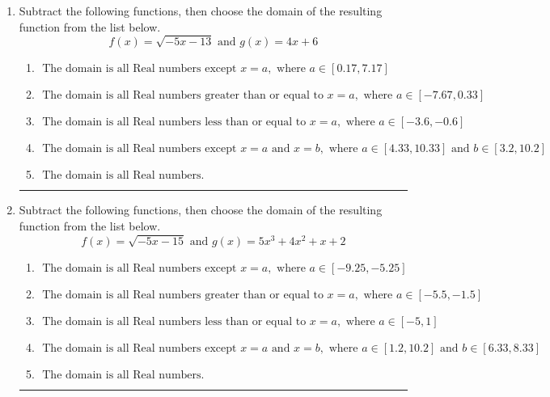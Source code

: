 \documentclass[14pt]{extbook}
\newcommand{\litem}[1]{\item#1\hspace*{-1cm}\rule{\textwidth}{0.4pt}}
\begin{document}
\begin{enumerate}
{\begin{enumerate}[label=\Alph*.]
\end{enumerate} }
\litem{
Subtract the following functions, then choose the domain of the resulting function from the list below.\[ f(x) = \sqrt{-5x-13}  \text{ and } g(x) = 4x + 6 \]\begin{enumerate}[label=\Alph*.]
\item \( \text{ The domain is all Real numbers except } x = a, \text{ where } a \in [0.17, 7.17] \)
\item \( \text{ The domain is all Real numbers greater than or equal to } x = a, \text{ where } a \in [-7.67, 0.33] \)
\item \( \text{ The domain is all Real numbers less than or equal to } x = a, \text{ where } a \in [-3.6, -0.6] \)
\item \( \text{ The domain is all Real numbers except } x = a \text{ and } x = b, \text{ where } a \in [4.33, 10.33] \text{ and } b \in [3.2, 10.2] \)
\item \( \text{ The domain is all Real numbers. } \)

\end{enumerate} }
\litem{
Subtract the following functions, then choose the domain of the resulting function from the list below.\[ f(x) = \sqrt{-5x-15}  \text{ and } g(x) = 5x^{3} +4 x^{2} +x + 2 \]\begin{enumerate}[label=\Alph*.]
\item \( \text{ The domain is all Real numbers except } x = a, \text{ where } a \in [-9.25, -5.25] \)
\item \( \text{ The domain is all Real numbers greater than or equal to } x = a, \text{ where } a \in [-5.5, -1.5] \)
\item \( \text{ The domain is all Real numbers less than or equal to } x = a, \text{ where } a \in [-5, 1] \)
\item \( \text{ The domain is all Real numbers except } x = a \text{ and } x = b, \text{ where } a \in [1.2, 10.2] \text{ and } b \in [6.33, 8.33] \)
\item \( \text{ The domain is all Real numbers. } \)

\end{enumerate} }
\end{enumerate}
\end{document}
